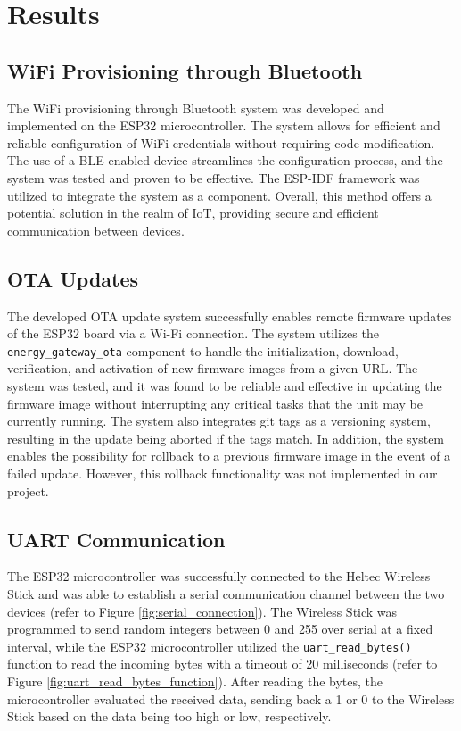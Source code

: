 \section{Results}\label{sec:results}

\subsection{WiFi Provisioning through Bluetooth}

The WiFi provisioning through Bluetooth system was developed and implemented on the ESP32 microcontroller. The system allows for efficient and reliable configuration of WiFi credentials without requiring code modification. The use of a BLE-enabled device streamlines the configuration process, and the system was tested and proven to be effective. The ESP-IDF framework was utilized to integrate the system as a component. Overall, this method offers a potential solution in the realm of IoT, providing secure and efficient communication between devices.

\subsection{OTA Updates}

The developed OTA update system successfully enables remote firmware updates of the ESP32 board via a Wi-Fi connection. The system utilizes the \texttt{energy\_gateway\_ota} component to handle the initialization, download, verification, and activation of new firmware images from a given URL. The system was tested, and it was found to be reliable and effective in updating the firmware image without interrupting any critical tasks that the unit may be currently running. The system also integrates git tags as a versioning system, resulting in the update being aborted if the tags match. In addition, the system enables the possibility for rollback to a previous firmware image in the event of a failed update. However, this rollback functionality was not implemented in our project.

\subsection{UART Communication}

The ESP32 microcontroller was successfully connected to the Heltec Wireless Stick and was able to establish a serial communication channel between the two devices (refer to Figure \ref{fig:serial_connection}). The Wireless Stick was programmed to send random integers between 0 and 255 over serial at a fixed interval, while the ESP32 microcontroller utilized the \texttt{uart\_read\_bytes()} function to read the incoming bytes with a timeout of 20 milliseconds (refer to Figure \ref{fig:uart_read_bytes_function}). After reading the bytes, the microcontroller evaluated the received data, sending back a 1 or 0 to the Wireless Stick based on the data being too high or low, respectively.

